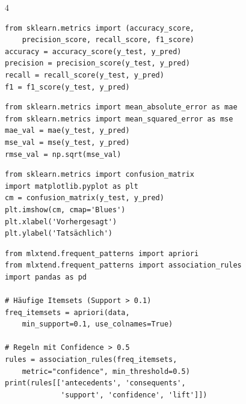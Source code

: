 \begin{landscape}
\begin{multicols*}{4}

		\begin{cheatSheetBox}[title=Klassifikations-Metriken]
			\begin{lstlisting}
from sklearn.metrics import (accuracy_score,
    precision_score, recall_score, f1_score)
accuracy = accuracy_score(y_test, y_pred)
precision = precision_score(y_test, y_pred)
recall = recall_score(y_test, y_pred)
f1 = f1_score(y_test, y_pred)
			\end{lstlisting}
		\end{cheatSheetBox}

		\begin{cheatSheetBox}[title=Regression-Metriken]
			\begin{lstlisting}
from sklearn.metrics import mean_absolute_error as mae
from sklearn.metrics import mean_squared_error as mse
mae_val = mae(y_test, y_pred)
mse_val = mse(y_test, y_pred)
rmse_val = np.sqrt(mse_val)
			\end{lstlisting}
		\end{cheatSheetBox}

		\begin{cheatSheetBox}[title=Konfusionsmatrix visualisieren]
			\begin{lstlisting}
from sklearn.metrics import confusion_matrix
import matplotlib.pyplot as plt
cm = confusion_matrix(y_test, y_pred)
plt.imshow(cm, cmap='Blues')
plt.xlabel('Vorhergesagt')
plt.ylabel('Tatsächlich')
			\end{lstlisting}
		\end{cheatSheetBox}

		\columnbreak


		\begin{cheatSheetBox}[title=Apriori mit MLxtend]
			\begin{lstlisting}
from mlxtend.frequent_patterns import apriori
from mlxtend.frequent_patterns import association_rules
import pandas as pd

# Häufige Itemsets (Support > 0.1)
freq_itemsets = apriori(data,
    min_support=0.1, use_colnames=True)

# Regeln mit Confidence > 0.5
rules = association_rules(freq_itemsets,
    metric="confidence", min_threshold=0.5)
print(rules[['antecedents', 'consequents',
             'support', 'confidence', 'lift']])
			\end{lstlisting}
		\end{cheatSheetBox}


\end{multicols*}
\end{landscape}

